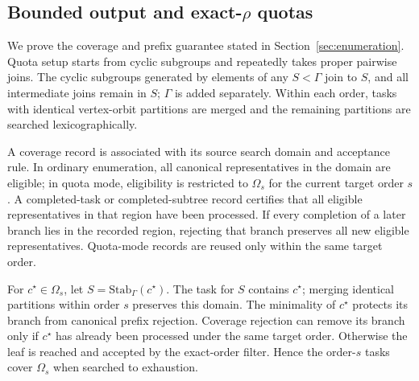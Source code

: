 \subsection{Bounded output and exact-$\rho$ quotas}
\label{app:quota_proof}

We prove the coverage and prefix guarantee stated in Section~\ref{sec:enumeration}. Quota setup starts from cyclic subgroups and repeatedly takes proper pairwise joins. The cyclic subgroups generated by elements of any $S<\Gamma$ join to $S$, and all intermediate joins remain in $S$; $\Gamma$ is added separately. Within each order, tasks with identical vertex-orbit partitions are merged and the remaining partitions are searched lexicographically.

A coverage record is associated with its source search domain and acceptance rule. In ordinary enumeration, all canonical representatives in the domain are eligible; in quota mode, eligibility is restricted to $\Omega_s$ for the current target order $s$. A completed-task or completed-subtree record certifies that all eligible representatives in that region have been processed. If every completion of a later branch lies in the recorded region, rejecting that branch preserves all new eligible representatives. Quota-mode records are reused only within the same target order.

For $c^\star\in\Omega_s$, let $S=\mathrm{Stab}_{\Gamma}(c^\star)$. The task for $S$ contains $c^\star$; merging identical partitions within order $s$ preserves this domain. The minimality of $c^\star$ protects its branch from canonical prefix rejection. Coverage rejection can remove its branch only if $c^\star$ has already been processed under the same target order. Otherwise the leaf is reached and accepted by the exact-order filter. Hence the order-$s$ tasks cover $\Omega_s$ when searched to exhaustion.

